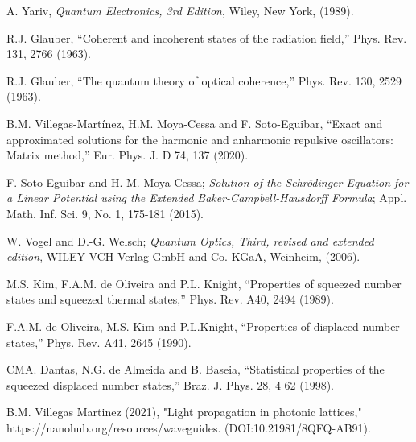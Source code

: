\documentclass[12pt]{article}
\numberwithin{equation}{section}
\begin{document}
\begin{thebibliography}{unsrt}
 A. Yariv, \textit{Quantum Electronics, 3rd Edition}, Wiley, New York, (1989).

 R.J. Glauber, “Coherent and incoherent states of the radiation field,” Phys. Rev. 131, 2766 (1963).

 R.J. Glauber, “The quantum theory of optical coherence,” Phys. Rev. 130, 2529 (1963).

 B.M. Villegas-Martínez, H.M. Moya-Cessa and F. Soto-Eguibar, “Exact and approximated solutions for the harmonic and anharmonic repulsive oscillators: Matrix method,” Eur. Phys. J. D 74, 137 (2020).

 F. Soto-Eguibar and H. M. Moya-Cessa; \textit{Solution of the Schrödinger Equation for a Linear Potential using the Extended Baker-Campbell-Hausdorff Formula}; Appl. Math. Inf. Sci. 9, No. 1, 175-181 (2015).

 W. Vogel and D.-G. Welsch; \textit{Quantum Optics, Third, revised and extended edition}, WILEY-VCH Verlag GmbH and Co. KGaA, Weinheim, (2006).

 M.S. Kim, F.A.M. de Oliveira and P.L. Knight, “Properties of squeezed number states and squeezed thermal states,” Phys. Rev. A40, 2494 (1989).

 F.A.M. de Oliveira, M.S. Kim and P.L.Knight, “Properties of displaced number states,” Phys. Rev. A41, 2645 (1990).

 CMA. Dantas, N.G. de  Almeida and B. Baseia, “Statistical properties of the squeezed displaced number states,”  Braz. J. Phys. 28, 4 62 (1998). 

 B.M. Villegas Martinez (2021), "Light propagation in photonic lattices," https://nanohub.org/resources/waveguides. (DOI:10.21981/8QFQ-AB91).

\end{thebibliography}
\end{document}

